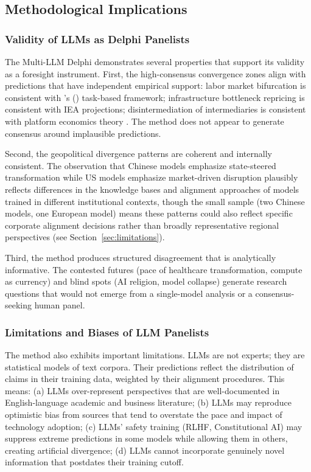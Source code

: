 \documentclass[preprint,review,12pt]{elsarticle}
\begin{document}
\subsection{Methodological Implications}
\label{sec:methodological_implications}


\subsubsection{Validity of LLMs as Delphi Panelists}
\label{sec:validity}

The Multi-LLM Delphi demonstrates several properties that support its validity as a foresight instrument. First, the high-consensus convergence zones align with predictions that have independent empirical support: labor market bifurcation is consistent with \citeauthor{acemoglu2019automation}'s (\citeyear{acemoglu2019automation}) task-based framework; infrastructure bottleneck repricing is consistent with IEA projections; disintermediation of intermediaries is consistent with platform economics theory \citep{goldfarb2019digital}. The method does not appear to generate consensus around implausible predictions.

Second, the geopolitical divergence patterns are coherent and internally consistent. The observation that Chinese models emphasize state-steered transformation while US models emphasize market-driven disruption plausibly reflects differences in the knowledge bases and alignment approaches of models trained in different institutional contexts, though the small sample (two Chinese models, one European model) means these patterns could also reflect specific corporate alignment decisions rather than broadly representative regional perspectives (see Section~\ref{sec:limitations}).

Third, the method produces structured disagreement that is analytically informative. The contested futures (pace of healthcare transformation, compute as currency) and blind spots (AI religion, model collapse) generate research questions that would not emerge from a single-model analysis or a consensus-seeking human panel.


\subsubsection{Limitations and Biases of LLM Panelists}
\label{sec:llm_limitations}

The method also exhibits important limitations. LLMs are not experts; they are statistical models of text corpora. Their predictions reflect the distribution of claims in their training data, weighted by their alignment procedures. This means: (a) LLMs over-represent perspectives that are well-documented in English-language academic and business literature; (b) LLMs may reproduce optimistic bias from sources that tend to overstate the pace and impact of technology adoption; (c) LLMs' safety training (RLHF, Constitutional AI) may suppress extreme predictions in some models while allowing them in others, creating artificial divergence; (d) LLMs cannot incorporate genuinely novel information that postdates their training cutoff.
\end{document}
